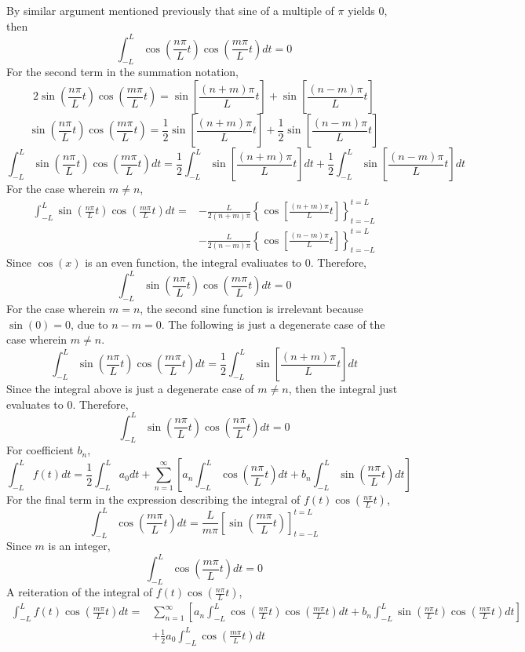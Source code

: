 By similar argument mentioned previously that sine of a multiple of $\pi$ yields $0$, then
$$\int_{-L}^{L}\cos\left(\frac{n\pi}{L}t\right)\cos\left(\frac{m\pi}{L}t\right)dt = 0$$
For the second term in the summation notation,
$$2\sin\left(\frac{n\pi}{L}t\right)\cos\left(\frac{m\pi}{L}t\right) = \sin\left[\frac{(n+m)\pi}{L}t\right] + \sin\left[\frac{(n-m)\pi}{L}t\right]$$
$$\sin\left(\frac{n\pi}{L}t\right)\cos\left(\frac{m\pi}{L}t\right) = \frac{1}{2}\sin\left[\frac{(n+m)\pi}{L}t\right] + \frac{1}{2}\sin\left[\frac{(n-m)\pi}{L}t\right]$$
$$\int_{-L}^{L}\sin\left(\frac{n\pi}{L}t\right)\cos\left(\frac{m\pi}{L}t\right)dt = \frac{1}{2}\int_{-L}^{L}\sin\left[\frac{(n+m)\pi}{L}t\right]dt + \frac{1}{2}\int_{-L}^{L}\sin\left[\frac{(n-m)\pi}{L}t\right]dt$$
For the case wherein $m\neq n$,
\begin{align*}
\int_{-L}^{L}\sin\left(\frac{n\pi}{L}t\right)\cos\left(\frac{m\pi}{L}t\right)dt = &-\frac{L}{2(n+m)\pi}\left\{\cos\left[\frac{(n+m)\pi}{L}t\right]\right\}_{t = -L}^{t = L} \\ & - \frac{L}{2(n-m)\pi}\left\{\cos\left[\frac{(n-m)\pi}{L}t\right]\right\}_{t = -L}^{t = L}
\end{align*}
Since $\cos(x)$ is an even function, the integral evaliuates to 0. Therefore,
$$\int_{-L}^{L}\sin\left(\frac{n\pi}{L}t\right)\cos\left(\frac{m\pi}{L}t\right)dt = 0$$
For the case wherein $m = n$, the second sine function is irrelevant because $\sin(0) = 0$, due to $n-m=0$. The following is just a degenerate case of the case wherein $m\neq n$.
$$\int_{-L}^{L}\sin\left(\frac{n\pi}{L}t\right)\cos\left(\frac{m\pi}{L}t\right)dt = \frac{1}{2}\int_{-L}^{L}\sin\left[\frac{(n+m)\pi}{L}t\right]dt$$
Since the integral above is just a degenerate case of $m\neq n$, then the integral just evaluates to $0$. Therefore,
$$\int_{-L}^{L}\sin\left(\frac{n\pi}{L}t\right)\cos\left(\frac{n\pi}{L}t\right)dt = 0$$
For coefficient $b_n$,
$$\int_{-L}^{L}f(t)dt = \frac{1}{2} \int_{-L}^{L}a_0dt + \sum_{n = 1}^{\infty}\left[a_n \int_{-L}^{L}\cos\left(\frac{n\pi}{L}t\right)dt + b_n \int_{-L}^{L}\sin\left(\frac{n\pi}{L}t\right)dt\right]$$
For the final term in the expression describing the integral of $\displaystyle{f(t)\cos\left(\frac{n\pi}{L}t\right)}$, 
$$\int_{-L}^{L}\cos\left(\frac{m\pi}{L}t\right)dt = \frac{L}{m\pi}\left[\sin\left(\frac{m\pi}{L}t\right)\right]^{t=L}_{t=-L}$$
Since $m$ is an integer,
$$\int_{-L}^{L}\cos\left(\frac{m\pi}{L}t\right)dt = 0$$
A reiteration of the integral of $\displaystyle{f(t)\cos\left(\frac{n\pi}{L}t\right)}$,
 \begin{align*}
\int_{-L}^{L}f(t)\cos\left(\frac{m\pi}{L}t\right)dt = &\sum_{n = 1}^{\infty}\left[a_n \int_{-L}^{L}\cos\left(\frac{n\pi}{L}t\right)\cos\left(\frac{m\pi}{L}t\right)dt + b_n \int_{-L}^{L}\sin\left(\frac{n\pi}{L}t\right)\cos\left(\frac{m\pi}{L}t\right)dt\right] \\ &+ \frac{1}{2}a_0 \int_{-L}^{L}\cos\left(\frac{m\pi}{L}t\right)dt
\end{align*}
